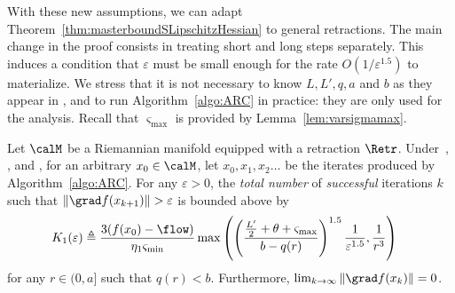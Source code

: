 With these new assumptions, we can adapt Theorem~\ref{thm:masterboundSLipschitzHessian} to general retractions. The main change in the proof consists in treating short and long steps separately. This induces a condition that $\varepsilon$ must be small enough for the rate $O(1/\varepsilon^{1.5})$ to materialize. We stress that it is not necessary to know $L, L', q, a$ and $b$ as they appear in ,  and  to run Algorithm~\ref{algo:ARC} in practice: they are only used for the analysis.
Recall that $\varsigma_{\max}$ is provided by Lemma~\ref{lem:varsigmamax}.
\begin{theorem} \label{thm:masterboundSLipschitzHessianretraction}
	Let $\calM$ be a Riemannian manifold equipped with a retraction $\Retr$.
	Under~, ,  and , for an arbitrary $x_0 \in \calM$, let $x_0, x_1, x_2\ldots$ be the iterates produced by Algorithm~\ref{algo:ARC}.
	For any $\varepsilon > 0$, the \emph{total number} of \emph{successful} iterations $k$ such that $\|\grad f(x_{k+1})\| > \varepsilon$ is bounded above by
	\begin{align*}
		K_1(\varepsilon) & \triangleq \frac{3(f(x_0) - \flow)}{\eta_1 \varsigma_{\min}} \max\left( \left( \frac{ \frac{L'}{2} + \theta + \varsigma_{\max} }{ b - q(r) } \right)^{1.5} \frac{1}{\varepsilon^{1.5}}, \frac{1}{r^3} \right)
	\end{align*}
	for any $r \in (0, a]$ such that $q(r) < b$.
	Furthermore, $\lim_{k \to \infty} \|\grad f(x_k)\| = 0$.
\end{theorem}
